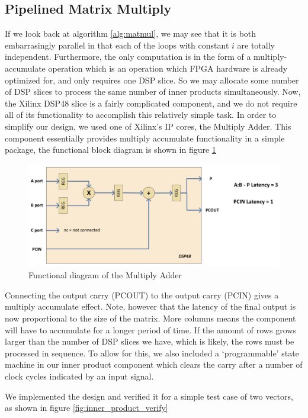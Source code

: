 \subsection{Pipelined Matrix Multiply}
If we look back at algorithm \ref{alg:matmul}, we may see that it is both embarrasingly parallel in that each of the loops with constant $i$ are totally independent.  Furthermore, the only computation is in the form of a multiply-accumulate operation which is an operation which FPGA hardware is already optimized for, and only requires one DSP slice.  So we may allocate some number of DSP slices to process the same number of inner products simultaneously.  Now, the Xilinx DSP48 slice is a fairly complicated component, and we do not require all of its functionality to accomplish this relatively simple task.  In order to simplify our design, we used one of Xilinx's IP cores, the Multiply Adder.  This component essentially provides multiply accumulate functionality in a simple package, the functional block diagram is shown in figure \ref{fig:mac}

\begin{figure}[H]
\includegraphics[width=\textwidth]{mac.png}
\caption{Functional diagram of the Multiply Adder}
\label{fig:mac}
\centering
\end{figure}

Connecting the output carry (PCOUT) to the output carry (PCIN) gives a multiply accumulate effect.  Note, however that the latency of the final output is now proportional to the size of the matrix.  More columns means the component will have to accumulate for a longer period of time.  If the amount of rows grows larger than the number of DSP slices we have, which is likely, the rows must be processed in sequence.  To allow for this, we also included a `programmable' state machine in our inner product component which clears the carry after a number of clock cycles indicated by an input signal.

We implemented the design and verified it for a simple test case of two vectors, as shown in figure \ref{fig:inner_product_verify}

